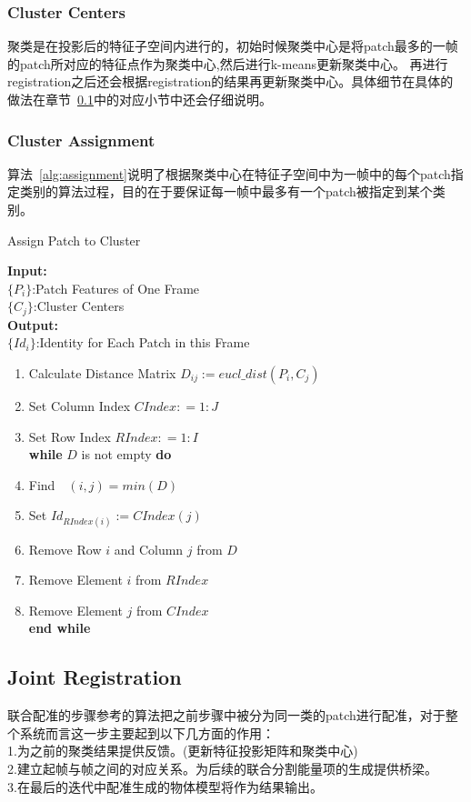 \subsubsection{Cluster Centers}
聚类是在投影后的特征子空间内进行的，初始时候聚类中心是将patch最多的一帧的patch所对应的特征点作为聚类中心,然后进行k-means更新聚类中心。
再进行registration之后还会根据registration的结果再更新聚类中心。具体细节在具体的做法在章节~\ref{subsec:registration}中的对应小节中还会仔细说明。
\subsubsection{Cluster Assignment}
算法~\ref{alg:assignment}说明了根据聚类中心在特征子空间中为一帧中的每个patch指定类别的算法过程，目的在于要保证每一帧中最多有一个patch被指定到某个类别。
\begin{algorithm}[htb]
\caption{Assign Patch to Cluster}
\label{alg:assignment}
\textbf{Input:}~~\\
$\{P_i\}$:Patch Features of One Frame~~\\
$\{C_j\}$:Cluster Centers~~\\
\textbf{Output:}~~\\
$\{Id_i\}$:Identity for Each Patch in this Frame
\begin{enumerate}
\item Calculate Distance Matrix $D_{ij}:=eucl\_dist(P_i,C_j)$
\item Set Column Index $CIndex: = 1:J$
\item Set Row Index $RIndex: = 1:I$\\
\textbf{while} $D$ is not empty \textbf{do}
\item Find~~$(i,j)=min(D)$
\item Set $Id_{RIndex(i)}:=CIndex(j)$
\item Remove Row $i$ and Column $j$ from $D$
\item Remove Element $i$ from $RIndex$
\item Remove Element $j$ from $CIndex$\\
\textbf{end while}
\end{enumerate}
\end{algorithm}
\subsection{Joint Registration}
\label{subsec:registration}
联合配准的步骤参考\cite{Evangelidis-ECCV-2014}的算法把之前步骤中被分为同一类的patch进行配准，对于整个系统而言这一步主要起到以下几方面的作用：\\
1.为之前的聚类结果提供反馈。(更新特征投影矩阵和聚类中心)\\
2.建立起帧与帧之间的对应关系。为后续的联合分割能量项的生成提供桥梁。\\
3.在最后的迭代中配准生成的物体模型将作为结果输出。\\
